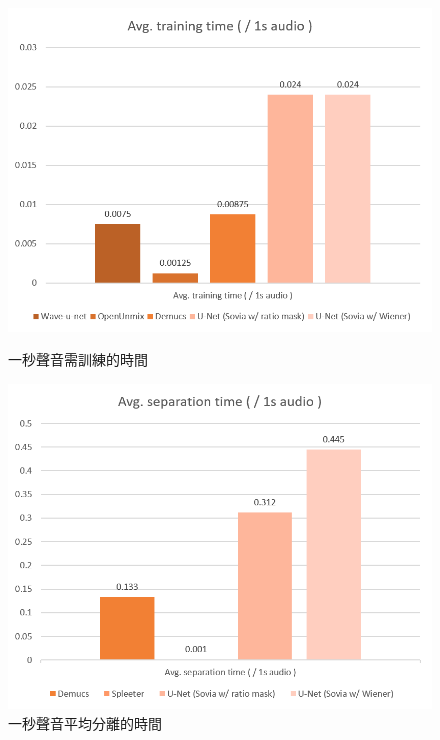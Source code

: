 \begin{figure}[htbp]
    \hfil
    \begin{minipage}[t]{0.45\textwidth}
        \centering
        \includegraphics[width=\textwidth]{./figures/chapter06_conclusions/pic_conclusions1.png}
        \caption {一秒聲音需訓練的時間}
        \label{pic_conclusions1}
    \end{minipage}
    \begin{minipage}[t]{0.45\textwidth}
        \centering
        \includegraphics[width=\textwidth]{./figures/chapter06_conclusions/pic_conclusions2.png}
        \caption {一秒聲音平均分離的時間}
        \label{pic_conclusions2}
    \end{minipage}
    \hfil
\end{figure}